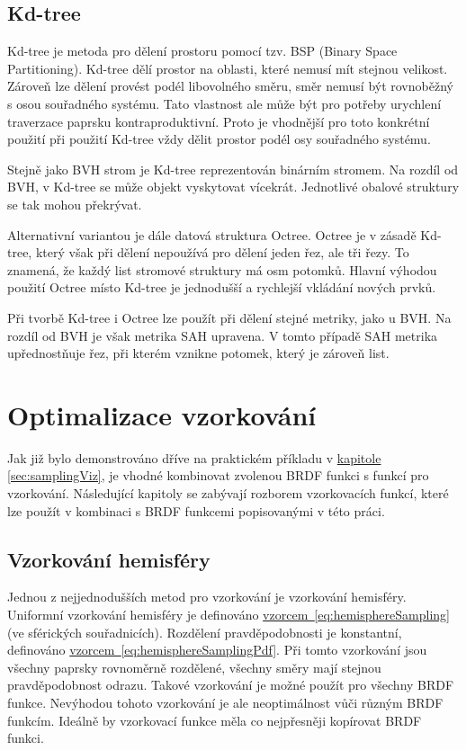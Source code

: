 \documentclass[czech,master]{diploma}
\begin{document}
\subsection{Kd-tree}
Kd-tree je metoda pro dělení prostoru pomocí tzv. BSP (Binary Space Partitioning). Kd-tree dělí prostor na oblasti, které nemusí mít stejnou velikost. Zároveň lze dělení provést podél libovolného směru, směr nemusí být rovnoběžný s osou souřadného systému. Tato vlastnost ale může být pro potřeby urychlení traverzace paprsku kontraproduktivní. Proto je vhodnější pro toto konkrétní použití při použití Kd-tree vždy dělit prostor podél osy souřadného systému. \par
Stejně jako BVH strom je Kd-tree reprezentován binárním stromem. Na rozdíl od BVH, v Kd-tree se může objekt vyskytovat vícekrát. Jednotlivé obalové struktury se tak mohou překrývat. \par
Alternativní variantou je dále datová struktura Octree. Octree je v zásadě Kd-tree, který však při dělení nepoužívá pro dělení jeden řez, ale tři řezy. To znamená, že každý list stromové struktury má osm potomků. Hlavní výhodou použití Octree místo Kd-tree je jednodušší a rychlejší vkládání nových prvků. \par
Při tvorbě Kd-tree i Octree lze použít při dělení stejné metriky, jako u BVH. Na rozdíl od BVH je však metrika SAH upravena. V tomto případě SAH metrika upřednostňuje řez, při kterém vznikne potomek, který je zároveň list.


\section{Optimalizace vzorkování}
Jak již bylo demonstrováno dříve na praktickém příkladu v \hyperref[sec:samplingViz]{kapitole \ref{sec:samplingViz}}, je vhodné kombinovat zvolenou BRDF funkci s funkcí pro vzorkování. Následující kapitoly se zabývají rozborem vzorkovacích funkcí, které lze použít v kombinaci s BRDF funkcemi popisovanými v této práci.

\subsection{Vzorkování hemisféry} \label{sec:hemisphere}
Jednou z nejjednodušších metod pro vzorkování je vzorkování hemisféry. Uniformní vzorkování hemisféry je definováno \hyperref[eq:hemisphereSampling]{vzorcem~\ref{eq:hemisphereSampling}} (ve sférických souřadnicích). Rozdělení pravděpodobnosti je konstantní, definováno \hyperref[eq:hemisphereSamplingPdf]{vzorcem~\ref{eq:hemisphereSamplingPdf}}. Při tomto vzorkování jsou všechny paprsky rovnoměrně rozdělené, všechny směry mají stejnou pravděpodobnost odrazu. Takové vzorkování je možné použít pro všechny BRDF funkce. Nevýhodou tohoto vzorkování je ale neoptimálnost vůči různým BRDF funkcím. Ideálně by vzorkovací funkce měla co nejpřesněji kopírovat BRDF funkci. \par
\end{document}
